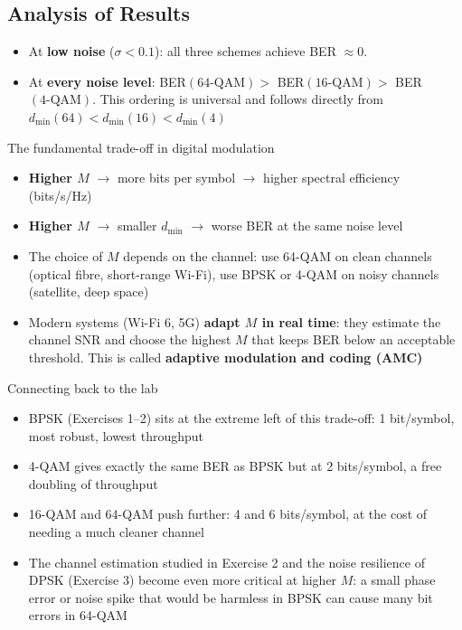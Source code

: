 \subsection{Analysis of Results}

\begin{itemize}
\item At \textbf{low noise} ($\sigma < 0.1$): all three schemes achieve BER $\approx 0$.

\item At \textbf{every noise level}: BER$(64\text{-QAM}) >$ BER$(16\text{-QAM}) >$ BER$(4\text{-QAM})$. This ordering is universal and follows directly from $d_{\min}(64) < d_{\min}(16) < d_{\min}(4)$
\end{itemize}

\vspace{2cm}

\begin{KeyBox}{The fundamental trade-off in digital modulation}
\begin{itemize}
\item \textbf{Higher $M$} $\rightarrow$ more bits per symbol $\rightarrow$ higher spectral efficiency (bits/s/Hz)
\item \textbf{Higher $M$} $\rightarrow$ smaller $d_{\min}$ $\rightarrow$ worse BER at the same noise level
\item The choice of $M$ depends on the channel: use 64-QAM on clean channels (optical fibre, short-range Wi-Fi), use BPSK or 4-QAM on noisy channels (satellite, deep space)
\item Modern systems (Wi-Fi 6, 5G) \textbf{adapt $M$ in real time}: they estimate the channel SNR and choose the highest $M$ that keeps BER below an acceptable threshold. This is called \textbf{adaptive modulation and coding (AMC)}
\end{itemize}
\end{KeyBox}

\vspace{2cm}

\begin{IntuitionBox}{Connecting back to the lab}
\begin{itemize}
\item BPSK (Exercises 1--2) sits at the extreme left of this trade-off: 1 bit/symbol, most robust, lowest throughput
\item 4-QAM gives exactly the same BER as BPSK but at 2 bits/symbol, a free doubling of throughput
\item 16-QAM and 64-QAM push further: 4 and 6 bits/symbol, at the cost of needing a much cleaner channel
\item The channel estimation studied in Exercise 2 and the noise resilience of DPSK (Exercise 3) become even more critical at higher $M$: a small phase error or noise spike that would be harmless in BPSK can cause many bit errors in 64-QAM
\end{itemize}
\end{IntuitionBox}
